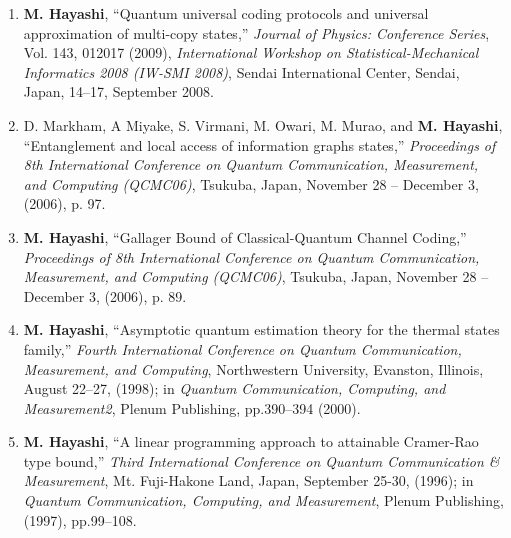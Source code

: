 \documentclass[a4paper,12pt,oneside]{article}
\begin{document}
\begin{enumerate}
    \item	\textbf{M. Hayashi}, 
    ``Quantum universal coding protocols and universal approximation of multi-copy states,'' 
    {\em Journal of Physics: Conference Series}, Vol. 143, 012017 (2009), 
    {\em International Workshop on Statistical-Mechanical Informatics 2008 (IW-SMI 2008)}, 
    Sendai International Center, Sendai, Japan, 14--17, September 2008.
    
    \item
    D. Markham, A Miyake, S. Virmani, M. Owari, M. Murao, and \textbf{M. Hayashi},
    ``Entanglement and local access of information graphs states,''
    {\em Proceedings of 8th International Conference on Quantum 
    Communication, Measurement, and Computing (QCMC06)},
    Tsukuba, Japan, November 28 -- December 3, (2006), p. 97.
    
    \item
    \textbf{M. Hayashi},
    ``Gallager Bound of Classical-Quantum Channel Coding,''
    {\em Proceedings of 8th International Conference on Quantum 
    Communication, Measurement, and Computing (QCMC06)},
    Tsukuba, Japan, November 28 -- December 3, (2006), p. 89.
    
    \item
    \textbf{M. Hayashi}, ``Asymptotic quantum estimation theory for the thermal states family,'' 
    {\em Fourth International Conference on 
    Quantum Communication, Measurement, and Computing}, 
    Northwestern University, Evanston, Illinois,  August 22--27, (1998);
    in {\em Quantum Communication, Computing, and Measurement2}, Plenum Publishing, pp.390--394 (2000).
    
    \item
    \textbf{M. Hayashi}, ``A linear programming approach to attainable Cramer-Rao type bound,'' 
    {\em Third International Conference on Quantum Communication \& Measurement}, 
    Mt. Fuji-Hakone Land, Japan, September 25-30, (1996);
    in {\em Quantum Communication, Computing, and Measurement}, Plenum Publishing, (1997), 
    pp.99--108.
\end{enumerate}
\end{document}
